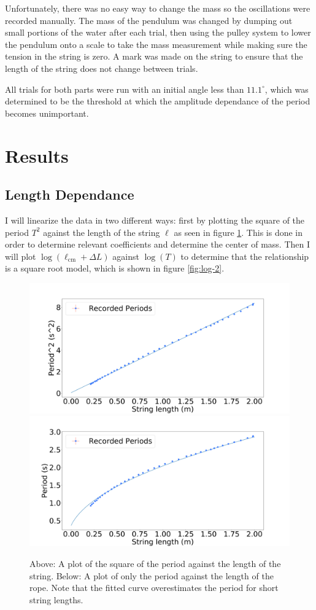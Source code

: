 \documentclass[%
 reprint,
 amsmath,amssymb
 aps,
]{revtex4-2}
\begin{document}
Unfortunately, there was no easy way to change the mass so the oscillations were recorded manually. The mass of the pendulum was changed by dumping out small portions of the water after each trial, then using the pulley system to lower the pendulum onto a scale to take the mass measurement while making sure the tension in the string is zero. A mark was made on the string to ensure that the length of the string does not change between trials.

All trials for both parts were run with an initial angle less than $11.1^\circ$, which was determined to be the threshold at which the amplitude dependance of the period becomes unimportant.
\section{Results}
\subsection{Length Dependance}
I will linearize the data in two different ways: first by plotting the square of the period $T^2$ against the length of the string $\ell$ as seen in figure \ref{fig:linear-1}. This is done in order to determine relevant coefficients and determine the center of mass. Then I will plot $\log(\ell_\text{cm}+\Delta L)$ against $\log(T)$ to determine that the relationship is a square root model, which is shown in figure \ref{fig:log-2}.
\begin{figure}[!h]
    \includegraphics[width=\linewidth]{Figures/linear_1.png}
    \includegraphics[width=\linewidth]{Figures/normal_1.png}

    \caption{Above: A plot of the square of the period against the length of the string. Below: A plot of only the period against the length of the rope. Note that the fitted curve overestimates the period for short string lengths.}
    \label{fig:linear-1}
\end{figure}
\end{document}
